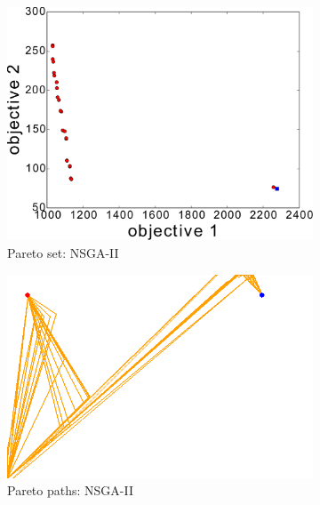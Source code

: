 \documentclass{article}
\begin{document}
\begin{figure}
\begin{subfigure}[b]{0.45\linewidth}
		\includegraphics[width=\textwidth]{fig/sim3-2obj/PF03-MOPATH.pdf}
		\caption{Pareto set: NSGA-II}
		\label{fig:sim:norm:pf:a}
	\end{subfigure}
	\begin{subfigure}[b]{0.45\linewidth}
		\centering
		\includegraphics[width=\textwidth]{fig/sim3-2obj/MOPath01-ALL.png}
		\caption{Pareto paths: NSGA-II}
		\label{fig:sim:norm:sols:a}
	\end{subfigure}  \\
	\begin{subfigure}[b]{0.45\linewidth}
		\centering

\end{subfigure}
\end{figure}
\end{document}
